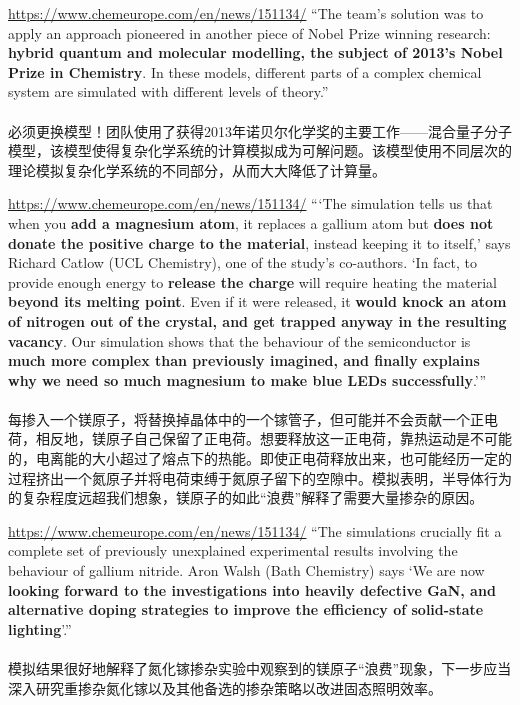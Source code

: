 \begin{slide}{\url{https://www.chemeurope.com/en/news/151134/}}
  ``The team's solution was to apply an approach pioneered in another piece of Nobel Prize winning research: \textbf{hybrid quantum and molecular modelling, the subject of 2013's Nobel Prize in Chemistry}. In these models, different parts of a complex chemical system are simulated with different levels of theory.''
  \\~\\
  必须更换模型！团队使用了获得2013年诺贝尔化学奖的主要工作——混合量子分子模型，该模型使得复杂化学系统的计算模拟成为可解问题。该模型使用不同层次的理论模拟复杂化学系统的不同部分，从而大大降低了计算量。
\end{slide}

\begin{slide}{\url{https://www.chemeurope.com/en/news/151134/}}
  \small
  ```The simulation tells us that when you \textbf{add a magnesium atom}, it replaces a gallium atom but \textbf{does not donate the positive charge to the material}, instead keeping it to itself,' says Richard Catlow (UCL Chemistry), one of the study's co-authors. `In fact, to provide enough energy to \textbf{release the charge} will require heating the material \textbf{beyond its melting point}. Even if it were released, it \textbf{would knock an atom of nitrogen out of the crystal, and get trapped anyway in the resulting vacancy}. Our simulation shows that the behaviour of the semiconductor is \textbf{much more complex than previously imagined, and finally explains why we need so much magnesium to make blue LEDs successfully}.'{''}
  \\~\\
  每掺入一个镁原子，将替换掉晶体中的一个镓管子，但可能并不会贡献一个正电荷，相反地，镁原子自己保留了正电荷。想要释放这一正电荷，靠热运动是不可能的，电离能的大小超过了熔点下的热能。即使正电荷释放出来，也可能经历一定的过程挤出一个氮原子并将电荷束缚于氮原子留下的空隙中。模拟表明，半导体行为的复杂程度远超我们想象，镁原子的如此“浪费”解释了需要大量掺杂的原因。
\end{slide}

\begin{slide}{\url{https://www.chemeurope.com/en/news/151134/}}
  ``The simulations crucially fit a complete set of previously unexplained experimental results involving the behaviour of gallium nitride. Aron Walsh (Bath Chemistry) says `We are now \textbf{looking forward to the investigations into heavily defective GaN, and alternative doping strategies to improve the efficiency of solid-state lighting}'.''
  \\~\\
  模拟结果很好地解释了氮化镓掺杂实验中观察到的镁原子“浪费”现象，下一步应当深入研究重掺杂氮化镓以及其他备选的掺杂策略以改进固态照明效率。
\end{slide}

